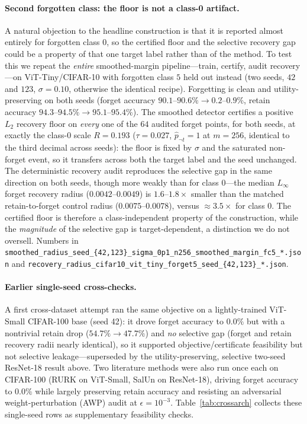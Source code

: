 \documentclass[11pt]{article}
\begin{document}
\paragraph{Second forgotten class: the floor is not a class-0 artifact.}
A natural objection to the headline construction is that it is reported almost
entirely for forgotten class $0$, so the certified floor and the selective
recovery gap could be a property of that one target label rather than of the
method. To test this we repeat the \emph{entire} smoothed-margin pipeline---train,
certify, audit recovery---on ViT-Tiny/CIFAR-10 with forgotten class $5$ held out
instead (two seeds, $42$ and $123$, $\sigma=0.10$, otherwise the identical recipe).
Forgetting is clean and utility-preserving on both seeds (forget accuracy
$90.1$--$90.6\%\!\to\!0.2$--$0.9\%$, retain accuracy $94.3$--$94.5\%\!\to\!95.1$--$95.4\%$).
The smoothed detector certifies a positive $L_2$
recovery floor on \emph{every} one of the $64$ audited forget points, for both
seeds, at exactly the class-0 scale $R=0.193$ ($\tau=0.027$, $\hat p_{\neg t}=1$ at
$m=256$, identical to the third decimal across seeds): the
floor is fixed by $\sigma$ and the saturated non-forget event, so it transfers
across both the target label and the seed unchanged. The deterministic recovery
audit reproduces the selective gap in the same direction on both seeds, though more
weakly than for class $0$---the median $L_\infty$ forget recovery radius
($0.0042$--$0.0049$) is $1.6$--$1.8\times$ smaller than the matched
retain-to-forget control radius ($0.0075$--$0.0078$), versus $\approx\!3.5\times$ for
class $0$. The certified floor is therefore a class-independent property of the
construction, while the \emph{magnitude} of the selective gap is target-dependent,
a distinction we do not oversell. Numbers in
\texttt{smoothed\_radius\_seed\_\{42,123\}\_sigma\_0p1\_n256\_smoothed\_margin\_fc5\_*.json}
and \texttt{recovery\_radius\_cifar10\_vit\_tiny\_forget5\_seed\_\{42,123\}\_*.json}.

\paragraph{Earlier single-seed cross-checks.} A first cross-dataset attempt ran
the same objective on a lightly-trained ViT-Small CIFAR-100 base (seed 42): it
drove forget accuracy to $0.0\%$ but with a nontrivial retain drop
($54.7\%\!\to\!47.7\%$) and \emph{no} selective gap (forget and retain recovery
radii nearly identical), so it supported objective/certificate feasibility but
not selective leakage---superseded by the utility-preserving, selective
two-seed ResNet-18 result above. Two literature methods were also run once each
on CIFAR-100 (RURK on ViT-Small, SalUn on ResNet-18), driving forget accuracy to
$0.0\%$ while largely preserving retain accuracy and resisting an adversarial
weight-perturbation (AWP) audit at $\epsilon=10^{-3}$. Table~\ref{tab:crossarch}
collects these single-seed rows as supplementary feasibility checks.
\end{document}
